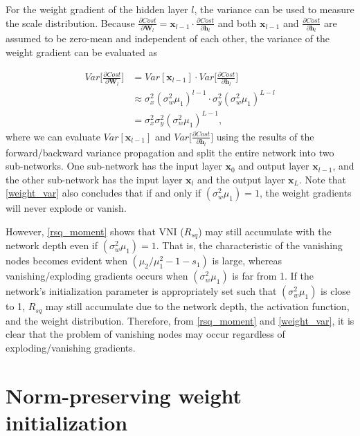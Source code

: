 For the weight gradient of the hidden layer $l$, the variance can be used to measure the scale distribution. Because $\frac{\partial Cost}{\partial \mathbf{W}_l}
=\mathbf{x}_{l-1}\cdot\frac{\partial Cost}{\partial \mathbf{h}_l}$ and both $\mathbf{x}_{l-1}$ and $\frac{\partial Cost}{\partial \mathbf{h}_l}$ are assumed to be zero-mean and independent of each other, the variance of the weight gradient can be evaluated as

\begin{equation}
    \begin{aligned}
    Var\Big[\frac{\partial Cost}{\partial \mathbf{W}_l}\Big]
    &=
    Var[\mathbf{x}_{l-1}]\cdot
    Var\Big[\frac{\partial Cost}{\partial \mathbf{h}_l}\Big]\\
    &
    \approx
    \sigma_x^2(\sigma_w^2\mu_1)^{l-1}\cdot
    \sigma_y^2(\sigma_w^2\mu_1)^{L-l}\\
    &=
    \sigma_x^2\sigma_y^2(\sigma_w^2\mu_1)^{L-1},
    \end{aligned}
    \label{weight_var}
\end{equation}
where we can evaluate $Var[\mathbf{x}_{l-1}]$ and $Var\Big[\frac{\partial Cost}{\partial \mathbf{h}_l}\Big]$ using the results of the forward/backward variance propagation and split the entire network into two sub-networks. One sub-network has the input layer $\mathbf{x}_{0}$ and output layer $\mathbf{x}_{l-1}$, and the other sub-network has the input layer $\mathbf{x}_{l}$ and the output layer $\mathbf{x}_{L}$. Note that \eqref{weight_var} also concludes that if and only if $(\sigma_w^2\mu_1)=1$, the weight gradients will never explode or vanish.

However, \eqref{rsq_moment} shows that VNI ($R_{sq}$) may still accumulate with the network depth even
if $(\sigma_w^2\mu_1)=1$. That is, the characteristic of the vanishing nodes becomes evident 
when $(\mu_2/\mu_1^2-1-s_1)$ is large, whereas vanishing/exploding gradients occurs when
$(\sigma_w^2\mu_1)$ is far from 1. If the network's initialization parameter is appropriately set such
that $(\sigma_w^2\mu_1)$ is close to 1, $R_{sq}$ may still accumulate due to the network depth, the
activation function, and the weight distribution. Therefore, from \eqref{rsq_moment} and
\eqref{weight_var}, it is clear that the problem of vanishing nodes  may occur regardless of 
exploding/vanishing gradients.

\section{Norm-preserving weight initialization} \label{comp:init}


